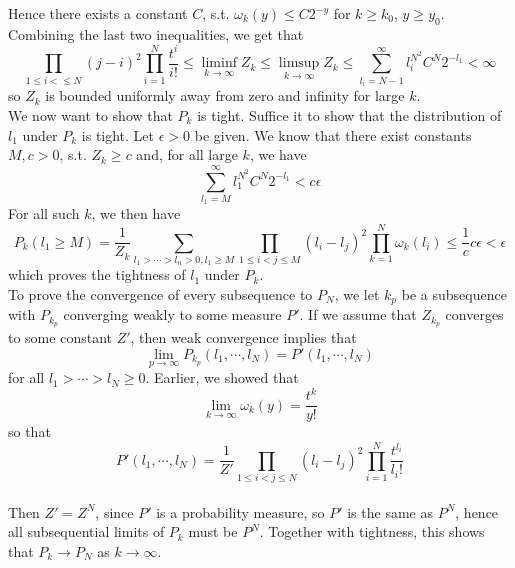 \documentclass[12pt]{article}
\begin{document}
Hence there exists a constant $C$, s.t. $\omega_k(y) \leq C 2^{-y}$ for $k \geq k_0$, $y \geq y_0$. Combining the last two inequalities, we get that
$$\prod_{1 \leq i <  \leq N} (j - i)^2 \prod_{i = 1}^N \frac{t^i}{i !} \leq \liminf_{k \rightarrow \infty} Z_k \leq \limsup_{k \rightarrow \infty} Z_k \leq \sum_{l_i = N - 1}^\infty l_i^{N^2} C^N 2^{-l_1} < \infty$$
so $Z_k$ is bounded uniformly away from zero and infinity for large $k$.\\

We now want to show that $P_k$ is tight. Suffice it to show that the distribution of $l_1$ under $P_k$ is tight. Let $\epsilon > 0$ be given. We know that there exist constants $M, c > 0$, s.t.
$Z_k \geq c$ and, for all large $k$, we have
$$\sum_{l_1 = M}^\infty l_1^{N^2}C^N 2^{-l_1} < c\epsilon$$
For all such $k$, we then have
$$P_k(l_1 \geq M) = \frac{1}{Z_k} \sum_{l_1 > \cdots > l_n > 0, l_1 \geq M} \prod_{1\leq i < j \leq M}(l_i - l_j)^2 \prod_{k = 1}^N \omega_k(l_i) \leq \frac{1}{c} c \epsilon < \epsilon$$
which proves the tightness of $l_1$ under $P_k$.\\

To prove the convergence of every subsequence to $P_N$, we let $k_p$ be a subsequence with $P_{k_p}$ converging weakly to some measure $P'$. If we assume that $Z_{k_p}$ converges to some constant $Z'$, then weak convergence implies that 
$$\lim_{p \rightarrow \infty} P_{k_p} (l_1, \cdots, l_N) = P'(l_1, \cdots, l_N)$$
for all $l_1 > \cdots > l_N \geq 0$. Earlier, we showed that
$$\lim_{k \rightarrow \infty} \omega_k(y) = \frac{t^k}{y!}$$
so that
$$P'(l_1, \cdots, l_N) = \frac{1}{Z'} \prod_{1 \leq i < j \leq N} (l_i - l_j)^2 \prod_{i = 1}^N \frac{t^{l_i}}{l_i !}$$\\

Then $Z' = Z^N$, since $P'$ is a probability measure, so $P'$ is the same as $P^N$, hence all subsequential limits of $P_k$ must be $P^N$. Together with tightness, this shows that $P_k \rightarrow P_N$ as $k \rightarrow \infty$.\\
\end{document}
